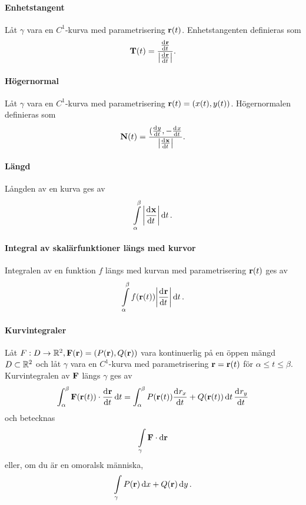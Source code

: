 \paragraph{Enhetstangent}
Låt $\gamma$ vara en $C^1$-kurva med parametrisering $\vect{r}(t)$. Enhetstangenten definieras som
\begin{align*}
	\vect{T}(t) = \frac{\deval{\vect{r}}{t}{t}}{\abs{\deval{\vect{r}}{t}{t}}}.
\end{align*}

\paragraph{Högernormal}
Låt $\gamma$ vara en $C^1$-kurva med parametrisering $\vect{r}(t) = (x(t), y(t))$. Högernormalen definieras som
\begin{align*}
	\vect{N}(t) = \frac{(\deval{y}{t}{t}, -\deval{x}{t}{t}}{\abs{\deval{\vect{x}}{t}{t}}}.
\end{align*}

\paragraph{Längd}
Långden av en kurva ges av
\begin{align*}
	\int\limits_{\alpha}^{\beta}\abs{\deval{\vect{x}}{t}{t}}\dd{t}.
\end{align*}

\paragraph{Integral av skalärfunktioner längs med kurvor}
Integralen av en funktion $f$ längs med kurvan med parametrisering $\vect{r}(t)$ ges av
\begin{align*}
	\int\limits_{\alpha}^{\beta}f(\vect{r}(t))\abs{\deval{\vect{r}}{t}{t}}\dd{t}.
\end{align*}

\paragraph{Kurvintegraler}
Låt $F: D\to\R^2, \vect{F}(\vect{r}) = (P(\vect{r}), Q(\vect{r}))$ vara kontinuerlig på en öppen mängd $D\subset\mathbb{R}^2$ och låt $\gamma$ vara en $C^1$-kurva med parametrisering $\vect{r} = \vect{r}(t)$ för $\alpha\leq t\leq\beta$. Kurvintegralen av $\vect{F}$ längs $\gamma$ ges av
\begin{align*}
	\int_{\alpha}^{\beta}\vect{F}(\vect{r}(t))\cdot\deval{\vect{r}}{t}{t}\dd{t} = \int_{\alpha}^{\beta}P(\vect{r}(t))\deval{r_x}{t}{t} + Q(\vect{r}(t))\dd{t}\deval{r_y}{t}{t}
\end{align*}
och betecknas
\begin{align*}
	\cint{\gamma}{\vect{F}}{\vect{r}}
\end{align*}
eller, om du är en omoralsk människa,
\begin{align*}
	\int\limits_{\gamma}P(\vect{r})\dd{x} + Q(\vect{r})\dd{y}.
\end{align*}

